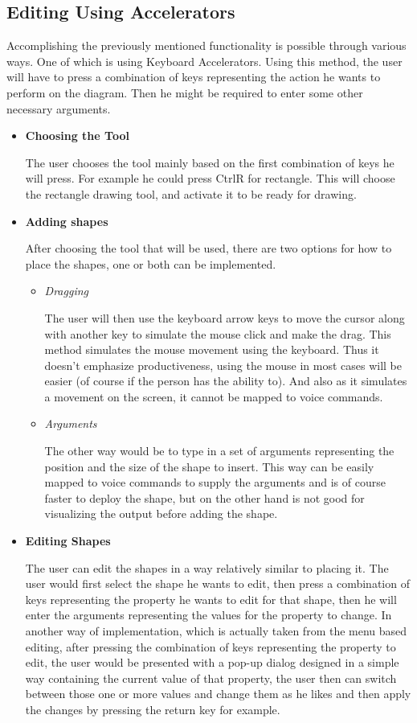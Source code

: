 \subsection{Editing Using Accelerators}
Accomplishing the previously mentioned functionality is possible through various ways. One of which is using Keyboard Accelerators. Using this method, the user will have to press a combination of keys representing the action he wants to perform on the diagram. Then he might be required to enter some other necessary arguments.

\begin{itemize}
\item {\bf Choosing the Tool}
\par \noindent
The user chooses the tool mainly based on the first combination of keys he will press. For example he could press CtrlR for rectangle. This will choose the rectangle drawing tool, and activate it to be ready for drawing.

\item {\bf Adding shapes}
\par \noindent
After choosing the tool that will be used, there are two options for how to place the shapes, one or both can be implemented.
	\begin{itemize}
	\item {\it Dragging}
	\par \noindent
	The user will then use the keyboard arrow keys to move the cursor along with another key to simulate the mouse click and make the drag. This method simulates the mouse movement using the keyboard. Thus it doesn't emphasize productiveness, using the mouse in most cases will be easier (of course if the person has the ability to). And also as it simulates a movement on the screen, it cannot be mapped to voice commands.
	
	\item {\it Arguments}
	\par \noindent
	The other way would be to type in a set of arguments representing the position and the size of the shape to insert. This way can be easily mapped to voice commands to supply the arguments and is of course faster to deploy the shape, but on the other hand is not good for visualizing the output before adding the shape.
	\end{itemize}

\item {\bf Editing Shapes}
\par \noindent
	The user can edit the shapes in a way relatively similar to placing it. The user would first select the shape he wants to edit, then press a combination of keys representing the property he wants to edit for that shape, then he will enter the arguments representing the values for the property to change. In another way of implementation, which is actually taken from the menu based editing, after pressing the combination of keys representing the property to edit, the user would be presented with a pop-up dialog  designed in a simple way containing the current value of that property, the user then can switch between those one or more values and change them as he likes and then apply the changes by pressing the return key for example.


\end{itemize}
